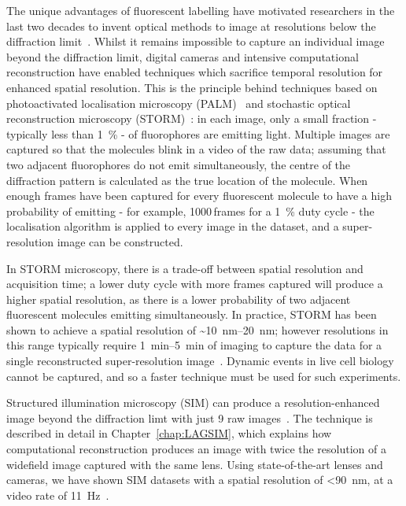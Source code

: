 The unique advantages of fluorescent labelling have motivated researchers in the last two decades to invent optical methods to image at resolutions below the diffraction limit~\cite{cornea2014fluorescence}.
Whilst it remains impossible to capture an individual image beyond the diffraction limit, digital cameras and intensive computational reconstruction have enabled techniques which sacrifice temporal resolution for enhanced spatial resolution.
This is the principle behind techniques based on photoactivated localisation microscopy (PALM)~\cite{betzig2006imaging} and stochastic optical reconstruction microscopy (STORM)~\cite{rust2006sub}: in each image, only a small fraction - typically less than \SI{1}{\percent} - of fluorophores are emitting light.
Multiple images are captured so that the molecules blink in a video of the raw data; assuming that two adjacent fluorophores do not emit simultaneously, the centre of the diffraction pattern is calculated as the true location of the molecule. 
When enough frames have been captured for every fluorescent molecule to have a high probability of emitting - for example, 1000\,frames for a \SI{1}{\percent} duty cycle - the localisation algorithm is applied to every image in the dataset, and a super-resolution image can be constructed. 

In STORM microscopy, there is a trade-off between spatial resolution and acquisition time; a lower duty cycle with more frames captured will produce a higher spatial resolution, as there is a lower probability of two adjacent fluorescent molecules emitting simultaneously. 
In practice, STORM has been shown to achieve a spatial resolution of \textasciitilde\SIrange[range-phrase=--]{10}{20}{\nano\metre}; however resolutions in this range typically require \SIrange[range-phrase=--]{1}{5}{\minute} of imaging to capture the data for a single reconstructed super-resolution image~\cite{heilemann2008subdiffraction}.
Dynamic events in live cell biology cannot be captured, and so a faster technique must be used for such experiments. 

Structured illumination microscopy (SIM) can produce a resolution-enhanced image beyond the diffraction limt with just 9 raw images~\cite{gustafsson2000surpassing}.
The technique is described in detail in Chapter~\ref{chap:LAGSIM}, which explains how computational reconstruction produces an image with twice the resolution of a widefield image captured with the same lens. 
Using state-of-the-art lenses and cameras, we have shown SIM datasets with a spatial resolution of <\SI{90}{\nano\metre}, at a video rate of \SI{11}{\hertz}~\cite{young2016guide}.   

